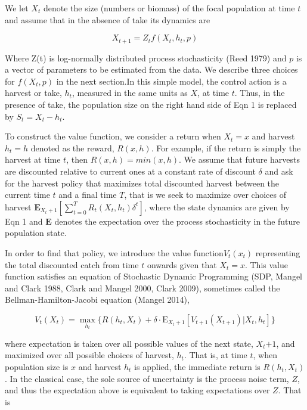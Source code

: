 \documentclass[]{components/elsarticle}
\begin{document}
We let $X_t$ denote the size (numbers or biomass) of the focal
population at time $t$ and assume that in the absence of take its
dynamics are

\[ X_{t+1}= Z_t f(X_t, h_t, p) \]

Where Z(t) is log-normally distributed process stochasticity (Reed 1979)
and $p$ is a vector of parameters to be estimated from the data. We
describe three choices for $f(X_t,p)$ in the next section.In this simple
model, the control action is a harvest or take, $h_t$, measured in the
same units as $X$, at time $t$. Thus, in the presence of take, the
population size on the right hand side of Eqn 1 is replaced by
$S_t=X_t-h_t$.

To construct the value function, we consider a return when $X_t=x$ and
harvest $h_t=h$ denoted as the reward, $R(x,h)$. For example, if the
return is simply the harvest at time $t$, then $R(x,h)=min(x,h)$. We
assume that future harvests are discounted relative to current ones at a
constant rate of discount $\delta$ and ask for the harvest policy that
maximizes total discounted harvest between the current time $t$ and a
final time $T$, that is we seek to maximize over choices of harvest
$\mathbf{E}_{X_t+1} [ \sum_{t = 0}^{T}  R_t(X_t, h_t) \delta^t]$, where
the state dynamics are given by Eqn 1 and $\mathbf{E}$ denotes the
expectation over the process stochasticity in the future population
state.

In order to find that policy, we introduce the value function$V_t(x_t)$
representing the total discounted catch from time $t$ onwards given that
$X_t=x$. This value function satisfies an equation of Stochastic Dynamic
Programming (SDP, Mangel and Clark 1988, Clark and Mangel 2000, Clark
2009), sometimes called the Bellman-Hamilton-Jacobi equation (Mangel
2014),

\begin{equation}
V_t(X_t) = \max_{h_t} \lbrace R(h_t, X_t) + \delta \cdot \mathbf{\mathrm{E}}_{X_t+1} \left[ V_{t+1}( X_{t+1}) | X_t, h_t \right] \rbrace
\end{equation}

where expectation is taken over all possible values of the next state,
$X_t{+1}$, and maximized over all possible choices of harvest, $h_t$.
That is, at time $t$, when population size is $x$ and harvest $h_t$ is
applied, the immediate return is $R(h_t, X_t)$. In the classical case,
the sole source of uncertainty is the process noise term, $Z$, and thus
the expectation above is equivalent to taking expectations over $Z$.
That is
\end{document}
